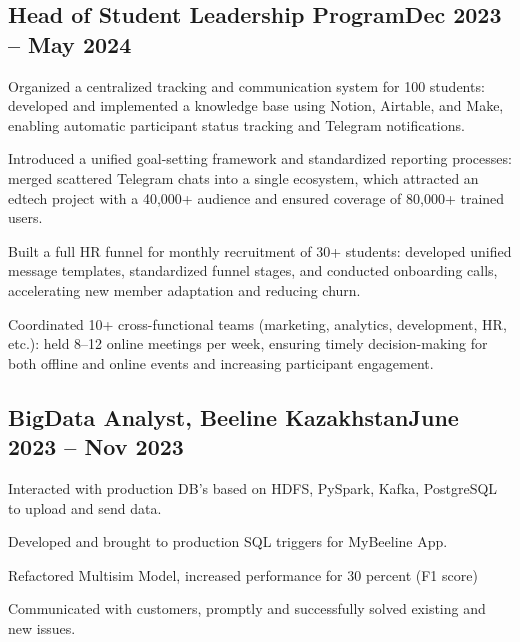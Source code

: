 \documentclass[a4paper,12pt]{article}
\begin{document}
\vspace*{6pt}
\subsection{{Head of Student Leadership Program}\hfill Dec 2023 -- May 2024}
\begin{zitemize}
\item Organized a centralized tracking and communication system for 100 students: developed and implemented a knowledge base using Notion, Airtable, and Make, enabling automatic participant status tracking and Telegram notifications.
\item Introduced a unified goal-setting framework and standardized reporting processes: merged scattered Telegram chats into a single ecosystem, which attracted an edtech project with a 40,000+ audience and ensured coverage of 80,000+ trained users.
\item Built a full HR funnel for monthly recruitment of 30+ students: developed unified message templates, standardized funnel stages, and conducted onboarding calls, accelerating new member adaptation and reducing churn.
\item Coordinated 10+ cross-functional teams (marketing, analytics, development, HR, etc.): held 8–12 online meetings per week, ensuring timely decision-making for both offline and online events and increasing participant engagement.
\end{zitemize}


\subsection{{BigData Analyst, Beeline Kazakhstan}\hfill June 2023 -- Nov 2023}
\begin{zitemize}
\item Interacted with production DB's based on HDFS, PySpark, Kafka, PostgreSQL to upload and send data.
\item Developed and brought to production SQL triggers for MyBeeline App.
\item Refactored Multisim Model, increased performance for 30 percent (F1 score)
\item Communicated with customers, promptly and successfully solved existing and new issues.
\end{zitemize}

\end{document}
